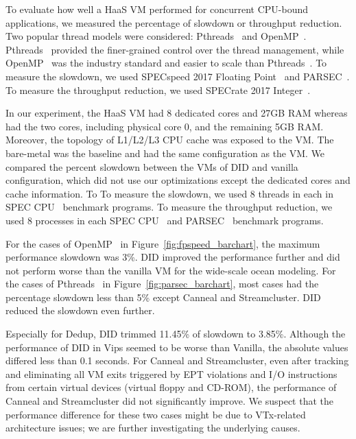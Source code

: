 



To evaluate how well a HaaS VM performed for concurrent
CPU-bound applications, we measured the percentage of slowdown
or throughput reduction. Two popular thread models were
considered: Pthreads~\cite{lewis:1998} and
OpenMP~\cite{dagum:1998}. Pthreads~\cite{lewis:1998} provided
the finer-grained control over the thread management, while
OpenMP~\cite{dagum:1998} was the industry standard and easier
to scale than Pthreads~\cite{lewis:1998}. To measure the
slowdown, we used SPECspeed 2017 Floating
Point~\cite{bucek:2018} and PARSEC~\cite{lewis:1998}. To
measure the throughput reduction, we used SPECrate 2017
Integer~\cite{bucek:2018}.

In our experiment, the HaaS VM had 8 dedicated cores and 27GB
RAM whereas \na had the two cores, including physical core 0,
and the remaining 5GB RAM. Moreover, the topology of L1/L2/L3
CPU cache was exposed to the VM. The bare-metal was the
baseline and had the same configuration as the VM. We compared
the percent slowdown between the VMs of DID and vanilla
configuration, which did not use our optimizations except the
dedicated cores and cache information. To To measure the
slowdown, we used 8 threads in each in SPEC
CPU~\cite{bucek:2018} benchmark programs. To measure the
throughput reduction, we used 8 processes in each SPEC
CPU~\cite{bucek:2018} and PARSEC~\cite{lewis:1998} benchmark
programs.

For the cases of OpenMP~\cite{dagum:1998} in
Figure~\ref{fig:fpspeed_barchart}, the maximum performance
slowdown was 3\%. DID improved the performance further and did
not perform worse than the vanilla VM for the wide-scale ocean
modeling. For the cases of Pthreads~\cite{lewis:1998} in
Figure~\ref{fig:parsec_barchart}, most cases had the
percentage slowdown less than 5\% except Canneal and
Streamcluster. DID reduced the slowdown even further.

Especially for Dedup, DID trimmed 11.45\% of slowdown to
3.85\%. Although the performance of DID in Vips seemed to be
worse than Vanilla, the absolute values differed less than 0.1
seconds. For Canneal and Streamcluster, even after tracking
and eliminating all VM exits triggered by EPT violations and
I/O instructions from certain virtual devices (virtual floppy
and CD-ROM), the performance of Canneal and Streamcluster did
not significantly improve. We suspect that the performance
difference for these two cases might be due to VTx-related
architecture issues; we are further investigating the
underlying causes.

